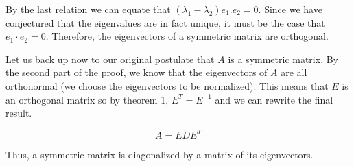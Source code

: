 \documentclass[12pt,notitlepage,oneside]{report}
\begin{document}
By the last relation we can equate that $(\lambda_1-\lambda_2)e_1 .e_2 = 0$. Since we have conjectured that the eigenvalues are in fact unique, it must be the case that $e_1 · e_2 = 0$. Therefore, the eigenvectors of a symmetric matrix are orthogonal.


Let us back up now to our original postulate that $A$ is a symmetric matrix. By the second part of the proof, we know that the eigenvectors of $A$ are all orthonormal (we choose the eigenvectors to be normalized). This means that $E$ is an orthogonal matrix so by theorem 1, $E^T = E^{-1}$ and we can rewrite the final result.

$$ A = EDE^T $$

Thus, a symmetric matrix is diagonalized by a matrix of its eigenvectors.


%

%
\end{document}
